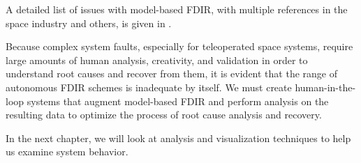 A detailed list of issues with model-based FDIR, with multiple references in the space industry and others, is given in \cite{kurien2010intrinsic}.

Because complex system faults, especially for teleoperated space systems, require large amounts of human analysis, creativity, and validation in order to understand root causes and recover from them, it is evident that the range of autonomous FDIR schemes is inadequate by itself. We must create human-in-the-loop systems that augment model-based FDIR and perform analysis on the resulting data to optimize the process of root cause analysis and recovery.

In the next chapter, we will look at analysis and visualization techniques to help us examine system behavior.